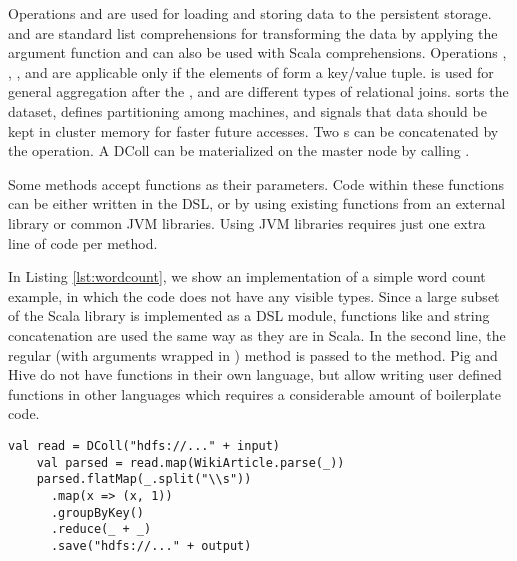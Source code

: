Operations  and  are used for loading and storing data
to the persistent storage.  and  are standard
list comprehensions for transforming the data by applying the argument function
and can also be used with Scala  comprehensions. Operations
, , ,  and 
are applicable only if the elements of  form a key/value tuple.
 is used for general aggregation after the ,
 and  are different types of relational joins.
 sorts the dataset,  defines partitioning among
machines, and  signals that data should be kept in cluster memory
for faster future accesses. Two s can be concatenated by the
\code{++} operation. A DColl can be materialized on the master node by calling
.

Some methods accept functions as their parameters. Code within these functions
can be either written in the \tool DSL, or by using existing functions from an
external library or common JVM libraries. Using JVM libraries requires just one
extra line of code per method.

In Listing \ref{lst:wordcount}, we show an implementation of a simple word count
example, in which the code does not have any visible  types. Since a
large subset of the Scala library is implemented as a DSL module, functions like
 and string concatenation are used the same way as they are in
Scala. In the second line, the regular (with arguments wrapped in )
method  is passed to the  method. Pig and Hive do not have
functions in their own language, but allow writing user defined functions in
other languages which requires a considerable amount of boilerplate code.

\begin{lstlisting}[name=code, caption=Example of word count program where type inference removes the need to declare any \scode{Rep} types., captionpos=b, label=lst:wordcount, float=t]
    val read = DColl("hdfs://..." + input)
    val parsed = read.map(WikiArticle.parse(_))
    parsed.flatMap(_.split("\\s"))
      .map(x => (x, 1))
      .groupByKey()
      .reduce(_ + _)
      .save("hdfs://..." + output)
\end{lstlisting}

